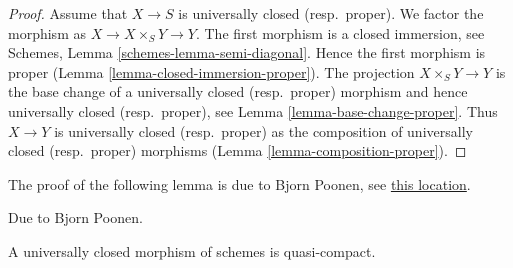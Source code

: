 \begin{proof}
Assume that $X \to S$ is universally closed (resp.\ proper).
We factor the morphism as $X \to X \times_S Y \to Y$.
The first morphism is a closed immersion, see
Schemes, Lemma \ref{schemes-lemma-semi-diagonal}.
Hence the first morphism is proper (Lemma \ref{lemma-closed-immersion-proper}).
The projection $X \times_S Y \to Y$ is the base change
of a universally closed (resp.\ proper) morphism and hence
universally closed (resp.\ proper), see Lemma \ref{lemma-base-change-proper}.
Thus $X \to Y$ is universally closed (resp.\ proper) as the composition
of universally closed (resp.\ proper) morphisms
(Lemma \ref{lemma-composition-proper}).
\end{proof}

\noindent
The proof of the following lemma is due to Bjorn Poonen, see
\href{https://mathoverflow.net/questions/23337/is-a-universally-closed-morphism-of-schemes-quasi-compact/23528#23528}{this location}.

\begin{lemma}
\label{lemma-universally-closed-quasi-compact}
\begin{reference}
Due to Bjorn Poonen.
\end{reference}
A universally closed morphism of schemes is quasi-compact.
\end{lemma}

